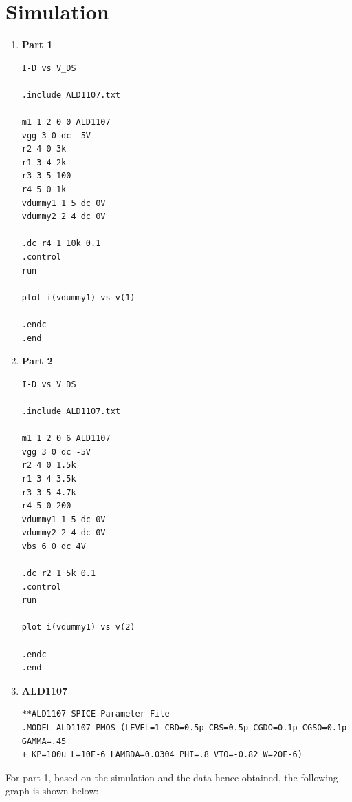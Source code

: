\documentclass[12pt]{article}
\begin{document}
\section{Simulation}
\begin{enumerate}
\item \textbf{Part 1}

\begin{verbatim}
I-D vs V_DS

.include ALD1107.txt

m1 1 2 0 0 ALD1107
vgg 3 0 dc -5V
r2 4 0 3k
r1 3 4 2k
r3 3 5 100
r4 5 0 1k
vdummy1 1 5 dc 0V
vdummy2 2 4 dc 0V 

.dc r4 1 10k 0.1
.control
run

plot i(vdummy1) vs v(1)

.endc
.end
\end{verbatim}


\item \textbf{Part 2}

\begin{verbatim}
I-D vs V_DS

.include ALD1107.txt

m1 1 2 0 6 ALD1107
vgg 3 0 dc -5V
r2 4 0 1.5k
r1 3 4 3.5k
r3 3 5 4.7k
r4 5 0 200
vdummy1 1 5 dc 0V
vdummy2 2 4 dc 0V 
vbs 6 0 dc 4V

.dc r2 1 5k 0.1
.control
run

plot i(vdummy1) vs v(2)

.endc
.end
\end{verbatim}

\item \textbf{ALD1107}

\begin{verbatim}
**ALD1107 SPICE Parameter File
.MODEL ALD1107 PMOS (LEVEL=1 CBD=0.5p CBS=0.5p CGDO=0.1p CGSO=0.1p GAMMA=.45
+ KP=100u L=10E-6 LAMBDA=0.0304 PHI=.8 VTO=-0.82 W=20E-6)
\end{verbatim}
\end{enumerate}

For part 1, based on the simulation and the data hence obtained, the following graph is shown below:
\end{document}
